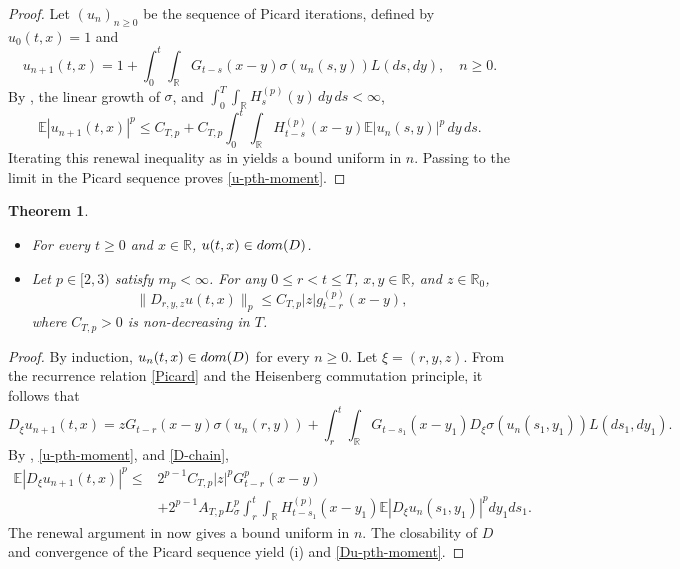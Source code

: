 \documentclass[10pt,a4paper]{amsart}
\newtheorem{theorem}{Theorem}[section]
\def\bE{\mathbb{E}}
\def\bR{\mathbb{R}}
\begin{document}
\begin{proof}
Let $(u_n)_{n\geq 0}$ be the sequence of Picard iterations, defined by
$u_0(t,x)=1$ and
\begin{equation}
\label{Picard}
u_{n+1}(t,x)=1+\int_0^t \int_{\bR} G_{t-s}(x-y) \sigma (u_n(s,y)) L(ds,dy),
\quad n\geq 0.
\end{equation}
By \cite[Lemma~2.5]{BLW26}, the linear growth of $\sigma$, and
$\int_0^T\int_{\bR}H_s^{(p)}(y)\,dy\,ds<\infty$,
\[
\bE|u_{n+1}(t,x)|^p
\le
C_{T,p}
+C_{T,p}
\int_0^t\int_{\bR}
H_{t-s}^{(p)}(x-y)\bE|u_n(s,y)|^p\,dy\,ds .
\]
Iterating this renewal inequality as in \cite[Theorem~2.7]{BLW26}
yields a bound uniform in $n$. Passing to the limit in the Picard sequence
proves \eqref{u-pth-moment}.
\end{proof}


\begin{theorem}
\label{key-th-Du}
\begin{itemize}
\item[(i)] For every $t\geq0$ and $x\in\bR$, $u(t,x)\in{\rm dom}(D)$.
\item[(ii)] Let $p\in[2,3)$ satisfy $m_p<\infty$. For any
$0\le r<t\le T$, $x,y\in\bR$, and $z\in\bR_0$,
\begin{equation}
\label{Du-pth-moment}
 \| D_{r,y,z}u(t,x)\|_p\le C_{T,p}|z|g_{t-r}^{(p)}(x-y),
\end{equation}
where $C_{T,p}>0$ is non-decreasing in $T$.
\end{itemize}
\end{theorem}

\begin{proof}
By induction, $u_n(t,x)\in{\rm dom}(D)$ for every $n\ge0$.
Let $\xi=(r,y,z)$. From the recurrence relation \eqref{Picard} and the Heisenberg commutation principle, it follows that
\begin{equation*}
D_\xi u_{n+1}(t,x)=  zG_{t-r}(x-y)\sigma(u_n(r,y)) + \int_r^t\int_{\bR}
G_{t-s_1}(x-y_1)D_\xi\sigma(u_n(s_1,y_1))L(ds_1,dy_1).
\end{equation*}
 By \cite[Lemma~2.5]{BLW26}, \eqref{u-pth-moment}, and
\eqref{D-chain},
\begin{align*}
 \bE\left|D_{\xi}u_{n+1}(t,x)\right|^p \le &  2^{p-1}C_{T,p}|z|^pG_{t-r}^p(x-y)\\
 &+2^{p-1}A_{T,p}L_\sigma^p
\int_r^t\int_{\bR}
H_{t-s_1}^{(p)}(x-y_1)
\bE\left|D_{\xi}u_n(s_1,y_1)\right|^p
dy_1ds_1.
\end{align*}
The renewal argument in \cite[Theorem~3.1]{BLW26} now gives a bound
uniform in $n$. The closability of $D$ and convergence of the Picard sequence
yield (i) and \eqref{Du-pth-moment}.
\end{proof}
\end{document}

